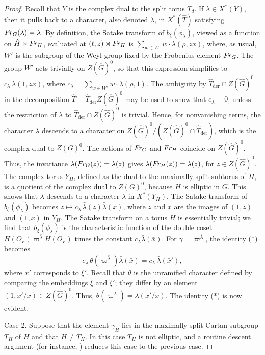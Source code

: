 \documentclass{amsart}
\newcommand\FrG{\text{$F\hskip-.1em r_G$}}
\newcommand\FrH{\text{$F\hskip-.1em r_H$}}
\newcommand\der{{\text{der}}}
\begin{document}
\begin{proof}
Recall that $Y$ is the complex dual to the split torus $T_d$.
If $\lambda\in X^*(Y)$, then it pulls back to a character,
also denoted $\lambda$, in $X^*(\hat T)$
satisfying $\FrG(\lambda) = \lambda$.  
By definition, the Satake transform of $b_\xi(\phi_\lambda)$,
viewed as a function on $\hat H\rtimes \FrH$,
evaluated at $(t,z)\rtimes\FrH$ is $\sum_{w\in W'} w\cdot\lambda(\rho,zx)$,
where, as usual,  $W'$ is the subgroup of the Weyl group fixed by
the Frobenius element $\FrG$. 
The 
group $W'$ acts trivially on $Z(\hat G)^0$, so that this expression simplifies
to $c_\lambda\,\lambda(1,zx)$, where $c_\lambda = \sum_{w\in W'} w\cdot \lambda(\rho,1)$.
The ambiguity by $\hat T_\der\cap Z(\hat G)^0$ in the decomposition 
$\hat T=\hat T_\der Z(\hat G)^0$
may be used to show that $c_\lambda=0$, unless the restriction of $\lambda$ to 
$\hat T_\der\cap Z(\hat G)^0$ is trivial.  Hence, for nonvanishing terms, 
the character $\lambda$
descends to a character on $Z(\hat G)^0/(Z(\hat G)^0\cap \hat T_\der)$,
which is the complex dual to $Z(G)^0$.
The
actions of $\FrG$ and $\FrH$ coincide on $Z(\hat G)^0$.  Thus, the invariance
$\lambda(\FrG(z))=\lambda(z)$ gives $\lambda(\FrH(z))=\lambda(z)$, for $z\in Z(\hat G)^0$.  The complex torus
$Y_H$, defined as the
 dual to the maximally split subtorus of $H$,
is a quotient of the complex dual to $Z(G)^0$, 
because $H$ is elliptic in $G$.
This shows that $\lambda$ descends to a character $\bar \lambda$ in $X^*(Y_H)$.
The Satake transform of $b_\xi(\phi_\lambda)$ becomes 
$\bar z\mapsto c_\lambda\,\bar\lambda(\bar z)\bar\lambda(\bar x)$,
where $\bar z$ and $\bar x$ are the images of $(1,z)$ and $(1,x)$ in $Y_H$.
The Satake transform on a torus $H$ is essentially trivial; we find that
$b_\xi(\phi_\lambda)$ is the characteristic function of 
the double coset $H(O_F)\varpi^{\bar \lambda}H(O_F)$
times the constant $c_\lambda\bar \lambda(\bar x)$.  
For $\gamma=\varpi^{\bar \lambda}$,
the identity (*) becomes
$$c_\lambda\,\theta(\varpi^{\bar\lambda}) \bar\lambda(\bar x) = c_\lambda\,\bar\lambda(\bar x'),$$
where $\bar x'$ corresponds to $\xi'$.  Recall that $\theta$ is the unramified
character defined by comparing the embeddings $\xi$ and $\xi'$; they differ
by an element $(1,x'/x)\in Z(\hat G)^0$.  Thus,
$\theta(\varpi^{\bar\lambda})=\bar\lambda(\bar x'/\bar x)$.
The identity (*) is now evident.
\smallskip

Case 2.  Suppose that the element $\gamma_H$ lies
in the maximally split Cartan subgroup $T_H$ of $H$ 
and that $H\ne T_H$.  In this case $T_H$ is not elliptic,
and a routine descent argument (for instance, \cite{H2,9}) reduces
this case to the previous case.
\smallskip


\end{proof}
\end{document}
